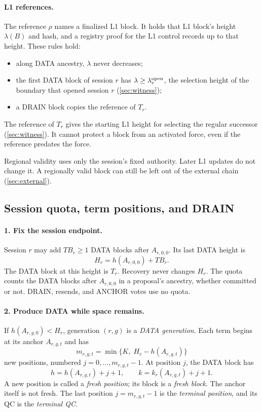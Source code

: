 \documentclass[11pt,a4paper]{article}
\newcommand{\TB}{\mathit{TB}}
\begin{document}
\paragraph{L1 references.}
The reference $\rho$ names a finalized L1 block. It holds that L1
block's height $\lambda(B)$ and hash, and a registry proof for the L1
control records up to that height. These rules hold:
\begin{itemize}
\item along DATA ancestry, $\lambda$ never decreases;
\item the first DATA block of session $r$ has $\lambda\ge
\lambda^{\rm open}_r$, the selection height of the boundary that opened
session $r$ (\cref{sec:witness});
\item a DRAIN block copies the reference of $T_r$.
\end{itemize}
The reference of $T_r$ gives the starting L1 height for selecting the
regular successor (\cref{sec:witness}). It cannot protect a block from
an activated force, even if the reference predates the force.

Regional validity uses only the session's fixed authority. Later L1
updates do not change it. A regionally valid block can still be left out
of the external chain (\cref{sec:external}).

\subsection{Session quota, term positions, and DRAIN}
\label{sec:quota}
\paragraph{1. Fix the session endpoint.}
Session $r$ may add $\TB_r\ge1$ DATA blocks after $A_{r,0,0}$. Its last
DATA height is
\[
 H_r=h(A_{r,0,0})+\TB_r.
\]
The DATA block at this height is $T_r$. Recovery never changes $H_r$.
The quota counts the DATA blocks after $A_{r,0,0}$ in a proposal's
ancestry, whether committed or not. DRAIN, resends, and ANCHOR votes
use no quota.

\paragraph{2. Produce DATA while space remains.}
If $h(A_{r,g,0})<H_r$, generation $(r,g)$ is a \emph{DATA generation}.
Each term begins at its anchor $A_{r,g,t}$ and has
\[
 m_{r,g,t}=\min\{K,\;H_r-h(A_{r,g,t})\}
\]
new positions, numbered $j=0,\ldots,m_{r,g,t}-1$. At position $j$, the
DATA block has
\[
 h=h(A_{r,g,t})+j+1,\qquad
 k=k_r(A_{r,g,t})+j+1.
\]
A new position is called a \emph{fresh position}; its block is a
\emph{fresh block}. The anchor itself is not fresh. The last position
$j=m_{r,g,t}-1$ is the \emph{terminal position}, and its QC is the
\emph{terminal QC}.
\end{document}
